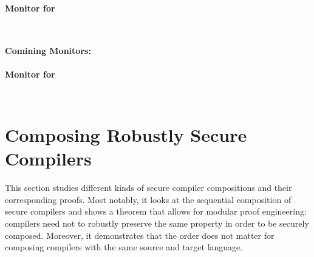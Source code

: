 \documentclass[acmsmall,review,screen,dvipsnames]{acmart}
\begin{document}
\paragraph{Monitor for }
\begin{gather*}
  \begin{aligned}
  \end{aligned}
\end{gather*}
\paragraph{Comining Monitors: }

\paragraph{Monitor for }
\begin{gather*}
  \begin{aligned}
  \end{aligned}
\end{gather*}


\section{Composing Robustly Secure Compilers}\label{sec:compcomp}
This section studies different kinds of secure compiler compositions and their corresponding proofs.
Most notably, it looks at the sequential composition of secure compilers and shows a theorem that allows for modular proof engineering: compilers need not to robustly preserve the same property in order to be securely composed.
Moreover, it demonstrates that the order does not matter for composing compilers with the same source and target language.
\end{document}
